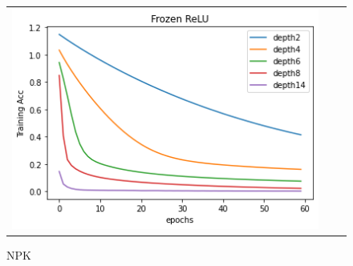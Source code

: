 \begin{figure}[h]
{\begin{tabular}{ccc}
\includegraphics[scale=0.4]{figs/Frozen-ReLU.png}
\end{tabular}
}
\caption{NPK}
\label{fig:opti}
\end{figure}

